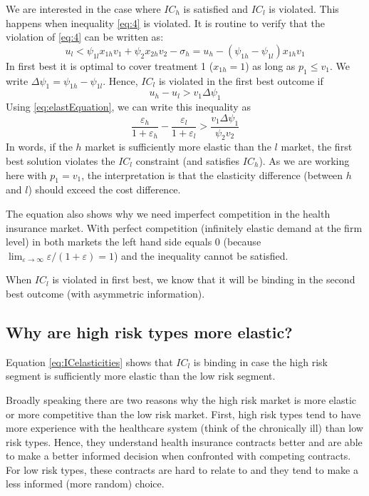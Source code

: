 \documentclass[a4paper,12pt]{article}
\begin{document}
We are interested in the case where \(IC_h\) is satisfied and \(IC_l\) is violated. This happens when inequality \eqref{eq:4} is violated. It is routine to verify that the violation of \eqref{eq:4} can be written as:
\begin{equation}
\label{eq:1}
u_l < \psi_{1l}x_{1h}v_1 + \psi_2x_{2h}v_2 -\sigma_h = u_h - (\psi_{1h}-\psi_{1l})x_{1h} v_1
\end{equation}
In first best it is optimal to cover treatment 1 (\(x_{1h}=1\)) as long as \(p_1 \leq v_1\). We write \(\Delta \psi_1 = \psi_{1h} - \psi_{1l}\). Hence, \(IC_l\) is violated in the first best outcome if
\begin{equation}
u_h - u_l > v_1 \Delta \psi_1
\end{equation}
Using \eqref{eq:elastEquation}, we can write this inequality as
\begin{equation}
\label{eq:ICelasticities}
\frac{\varepsilon_{h}}{1+\varepsilon_{h}} - \frac{\varepsilon_{l}}{1+\varepsilon_{l}} > \frac{v_{1} \Delta\psi_1}{\psi_2 v_2}
\end{equation}
In words, if the \(h\) market is sufficiently more elastic than the \(l\) market, the first best solution violates the \(IC_l\) constraint (and satisfies \(IC_h\)). As we are working here with \(p_1=v_1\), the interpretation is that the elasticity difference (between \(h\) and \(l\)) should exceed the cost difference.

The equation also shows why we need imperfect competition in the health insurance market. With perfect competition (infinitely elastic demand at the firm level) in both markets the left hand side equals 0 (because \(\lim_{\varepsilon \rightarrow \infty} \varepsilon/(1+\varepsilon) = 1\)) and the inequality cannot be satisfied.

When \(IC_l\) is violated in first best, we know that it will be binding in the second best outcome (with asymmetric information).


\subsection{Why are high risk types more elastic?}
\label{sec:org507f465}

Equation \eqref{eq:ICelasticities} shows that \(IC_l\) is binding in case the high risk segment is sufficiently more elastic than the low risk segment.

Broadly speaking there are two reasons why the high risk market is more elastic or more competitive than the low risk market. First, high risk types tend to have more experience with the healthcare system (think of the chronically ill) than low risk types. Hence, they understand health insurance contracts better and are able to make a better informed decision when confronted with competing contracts. For low risk types, these contracts are hard to relate to and they tend to make a less informed (more random) choice.
\end{document}
